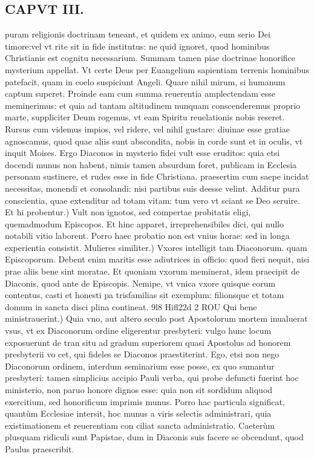 \documentclass{article}
\begin{document}
\begin{pages}
\section*{CAPVT III. }
\marginpar{[ p.37 ]}\pstart puram religionis doctrinam teneant, et quidem ex animo, eum serio Dei timore:vel vt rite sit in fide institutus: ne quid ignoret, quod hominibus Christianis est cognitu necessarium. Summam tamen piae doctrinae honorifice mysterium appellat. Vt certe Deus per Euangelium sapientiam terrenis hominibus patefacit, quam in coelo suspiciunt Angeli. Quare nihil mirum, si humanum captum superet. Proinde eam cum summa reuerentia amplectendam esse meminerimus: et quia ad tantam altitudinem nunquam conscenderemus proprio marte, suppliciter Deum rogemus, vt eam Spiritu reuelationis nobis reseret. Rursus cum videmus impios, vel ridere, vel nihil gustare: diuinae esse gratiae agnoscamus, quod quae aliis sunt abscondita, nobis in corde sunt et in oculis, vt inquit Moises. Ergo Diaconos in mysterio fidei vult esse eruditos: quia etsi docendi munus non habent, nimis tamen absurdum foret, publicam in Ecclesia personam sustinere, et rudes esse in fide Christiana. praesertim cum saepe incidat necessitas, monendi et consolandi: nisi partibus suis deesse velint. Additur pura conscientia, quae extenditur ad totam vitam: tum vero vt sciant se Deo seruire.  \pend\pstart Et hi probentur.) Vult non ignotos, sed compertae probitatis eligi, quemadmodum Episcopos. Et hinc apparet, irreprehensibiles dici, qui nullo notabili vitio laborent. Porro haec probatio non est vnius horae: sed in longa experientia consistit.  \pend\pstart Mulieres similiter.) Vxores intelligit tam Diaconorum. quam Episcoporum. Debent enim maritis esse adiutrices in officio: quod fieri nequit, nisi prae aliis bene sint moratae. Et quoniam vxorum meminerat, idem praecipit de Diaconis, quod ante de Episcopis. Nemipe, vt vnica vxore quisque eorum contentus, casti et honesti pa trisfamilias sit exemplum: filionsque et totam domum in sancta disci plina contineat. 9l8 Hifl22d 2 ROU  \pend\pstart Qui bene ministrauerint.) Quia vno, aut altero seculo post Apostolorum mortem inualuerat vsus, vt ex Diaconorum ordine eligerentur presbyteri: vulgo hunc locum exposuerunt de tran situ ad gradum superiorem quasi Apostolus ad honorem presbyterii vo cet, qui fideles se Diaconos praestiterint. Ego, etsi non nego Diaconorum ordinem, interdum seminarium esse posse, ex quo sumantur presbyteri: tamen simplicius accipio Pauli verba, qui probe defuncti fuerint hoc ministerio, non paruo honore dignos esse: quia non sit sordidum aliquod exercitium, sed honorificum imprimis munus. Porro hac particula significat, quantùm Ecclesiae intersit, hoc munus a viris selectis administrari, quia existimationem et reuerentiam con ciliat sancta administratio. Caeterùm plusquam ridiculi sunt Papistae, dum in Diaconis suis facere se obcendunt, quod Paulus praescribit.  \pend

\end{pages}
\end{document}
